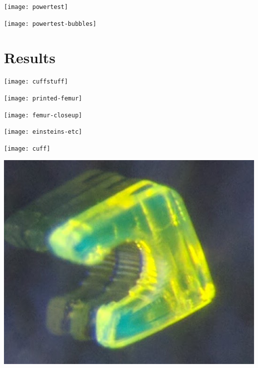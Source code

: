 \documentclass{beamer}
\begin{document}
\begin{frame}
  \texttt{[image: powertest]}
\end{frame}

\begin{frame}
  \texttt{[image: powertest-bubbles]}
\end{frame}



\section{Results}

\begin{frame}
  \texttt{[image: cuffstuff]}
\end{frame}

\begin{frame}
  \texttt{[image: printed-femur]}
\end{frame}

\begin{frame}
  \texttt{[image: femur-closeup]}
\end{frame}

\begin{frame}
  \texttt{[image: einsteins-etc]}
\end{frame}

\begin{frame}
  \texttt{[image: cuff]}
\end{frame}

\begin{frame}
  \includegraphics[width=\textwidth]{cuff-optical}
\end{frame}
\end{document}
